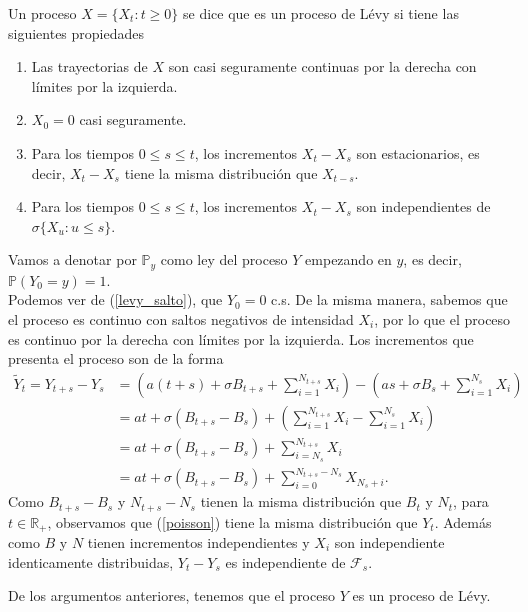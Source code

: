 \begin{definition} 
  Un proceso $X = \{ X_t : t \geq 0 \}$ se dice que es un proceso de Lévy si tiene las siguientes propiedades
  \begin{enumerate}
  	\item Las trayectorias de $X$ son casi seguramente continuas por la derecha con límites por la izquierda.
    \item $X_0 = 0$ casi seguramente.
    \item Para los tiempos $0 \leq s \leq t$, los incrementos $X_t - X_s$ son estacionarios, es decir, $X_t - X_s$ tiene la misma distribución que $X_{t-s}$.
    \item Para los tiempos $0 \leq s \leq t$, los incrementos $X_t - X_s$ son independientes de $\sigma \{ X_u : u \leq s \}$.
  \end{enumerate}
\end{definition}

Vamos a denotar por $\mathbb{P}_y$ como ley del proceso $Y$ empezando en $y$, es decir, $\mathbb{P}(Y_0 = y) = 1$. \\

Podemos ver de (\ref{levy_salto}), que $Y_0 = 0$ c.s. De la misma manera, sabemos que el proceso es continuo con saltos negativos de intensidad $X_i$, por lo que el proceso es continuo por la derecha con límites por la izquierda. Los incrementos que presenta el proceso son de la forma
\begin{align}
	\tilde{Y}_t = Y_{t+s} - Y_s & = \left( a(t+s) + \sigma B_{t+s} + \sum_{i = 1}^{N_{t+s}} X_i \right) - \left( as + \sigma B_s + \sum_{i = 1}^{N_s} X_i \right) \nonumber \\
    & = at + \sigma (B_{t+s} - B_{s}) + \left( \sum_{i = 1}^{N_{t+s}} X_i - \sum_{i = 1}^{N_s} X_i \right) \nonumber \\
    & = at + \sigma (B_{t+s} - B_{s}) + \sum_{i = N_s}^{N_{t+s}} X_i  \nonumber \\
    & = at + \sigma (B_{t+s} - B_{s}) + \sum_{i = 0}^{N_{t+s} - N_s} X_{N_s + i}. \label{poisson}
\end{align}
Como $B_{t+s} - B_s$ y $N_{t+s} - N_s$ tienen la misma distribución que $B_t$ y $N_t$, para $t \in \mathbb{R}_{+}$, observamos que (\ref{poisson}) tiene la misma distribución que $Y_t$. Además como $B$ y $N$ tienen incrementos independientes y $X_i$ son independiente identicamente distribuidas, $Y_t - Y_s$ es independiente de $\mathcal{F}_s$. 

De los argumentos anteriores, tenemos que el proceso $Y$ es un proceso de Lévy. \\

